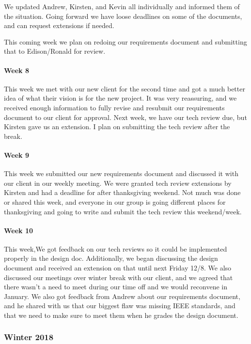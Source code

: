 \documentclass[onecolumn, draftclsnofoot,10pt, compsoc]{IEEEtran}
\begin{document}
        We updated Andrew, Kirsten, and Kevin all individually and informed them of the situation. Going forward we have loose deadlines on some of the documents, and can request extensions if needed. 
 
        This coming week we plan on redoing our requirements document and submitting that to Edison/Ronald for review. 
    
    \paragraph{Week 8}
        This week we met with our new client for the second time and got a much better idea of what their vision is for the new project. It was very reassuring, and we received enough information to fully revise and resubmit our requirements document to our client for approval. Next week, we have our tech review due, but Kirsten gave us an extension. I plan on submitting the tech review after the break. 

            
    \paragraph{Week 9}
        This week we submitted our new requirements document and discussed it with our client in our weekly meeting. We were granted tech review extensions by Kirsten and had a deadline for after thanksgiving weekend. Not much was done or shared this week, and everyone in our group is going different places for thanksgiving and going to write and submit the tech review this weekend/week. 

            
            
    \paragraph{Week 10}
        This week,We got feedback on our tech reviews so it could be implemented properly in the design doc. Additionally, we began discussing the design document and received an extension on that until next Friday 12/8. We also discussed our meetings over winter break with our client, and we agreed that there wasn't a need to meet during our time off and we would reconvene in January. We also got feedback from Andrew about our requirements document, and he shared with us that our biggest flaw was missing IEEE standards, and that we need to make sure to meet them when he grades the design document. 
        
        
\subsubsection{Winter 2018}
\end{document}
